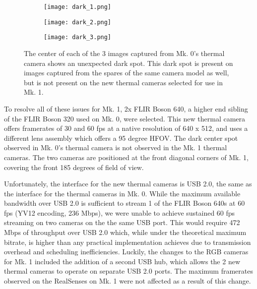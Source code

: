 \begin{figure}
	\centering
	\begin{subfigure}{0.32\textwidth}
		\centering
		\texttt{[image: dark\_1.png]}
		\label{dark_1}
	\end{subfigure}
	\hfill
	\begin{subfigure}{0.32\textwidth}
		\centering
		\texttt{[image: dark\_2.png]}
		\label{dark_2}
	\end{subfigure}		
	\hfill
	\begin{subfigure}{0.32\textwidth}
		\centering
		\texttt{[image: dark\_3.png]}
		\label{dark_3}
	\end{subfigure}	
	\caption[Dark spot visible on Mk. 0 thermal camera]{The center of each of the 3 images captured from Mk. 0's thermal camera shows an unexpected dark spot. This dark spot is present on images captured from the spares of the same camera model as well, but is not present on the new thermal cameras selected for use in Mk. 1.}
	\label{mk_0_dark_center}
\end{figure}

To resolve all of these issues for Mk. 1, 2x FLIR Boson 640, a higher end sibling of the FLIR Boson 320 used on Mk. 0, were selected. This new thermal camera offers framerates of 30 and 60 fps at a native resolution of 640 x 512, and uses a different lens assembly which offers a 95 degree HFOV. The dark center spot observed in Mk. 0's thermal camera is not observed in the Mk. 1 thermal cameras. The two cameras are positioned at the front diagonal corners of Mk. 1, covering the front 185 degrees of field of view.

Unfortunately, the interface for the new thermal cameras is USB 2.0, the same as the interface for the thermal cameras in Mk. 0. While the maximum available bandwidth over USB 2.0 is sufficient to stream 1 of the FLIR Boson 640s at 60 fps (YV12 encoding, 236 Mbps), we were unable to achieve sustained 60 fps streaming on two cameras on the the same USB port. This would require 472 Mbps of throughput over USB 2.0 which, while under the theoretical maximum bitrate, is higher than any practical implementation achieves due to transmission overhead and scheduling inefficiencies. Luckily, the changes to the RGB cameras for Mk. 1 included the addition of a second USB hub, which allows the 2 new thermal cameras to operate on separate USB 2.0 ports. The maximum framerates observed on the RealSenses on Mk. 1 were not affected as a result of this change.

